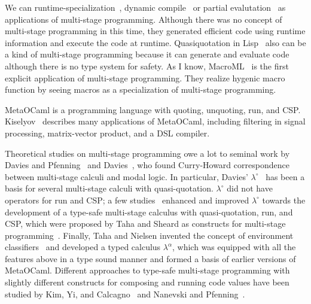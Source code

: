 We can runtime-specialization~\cite{ConselNoel1996Runtime},
dynamic compile~\cite{AuslanderPhiliposeChambersEggersBershad1996DynamicCompilation, EnglerHsiehKaashoek1996TickC, PolettoHsiehEnglerKaashoek1999CandTcc, GrantPhiliposeMockChambersEggers1999DyC} or
partial evalutation~\cite{JonesGomardSestoft1993partial} as applications of
multi-stage programming. Although there was no concept of multi-stage
programming in this time, they generated efficient code using runtime
information and execute the code at runtime. Quasiquotation in
Lisp~\cite{Bawden1999Lisp} also can be a kind of multi-stage programming
because it can generate and evaluate code although there is no type system for
safety. As I know, MacroML~\cite{GanzAmrTaha2001MacroML} is the first explicit
application of multi-stage programming. They realize hygenic macro function by
seeing macros as a specialization of multi-stage programming.



MetaOCaml is a programming language with quoting, unquoting, run, and CSP.
Kiselyov~\cite{8384206} describes many applications of MetaOCaml, including
filtering in signal processing, matrix-vector product, and a DSL compiler.


Theoretical studies on multi-stage programming owe a lot to seminal work by
Davies and Pfenning~\cite{DaviesPfenning01JACM} and
Davies~\cite{davies1996temporal}, who found Curry-Howard correspondence
between multi-stage calculi and modal logic. In particular, Davies'
$\lambda^\circ$~\cite{davies1996temporal} has been a basis for several
multi-stage calculi with quasi-quotation. $\lambda^\circ$ did not have
operators for run and CSP; a few
studies~\cite{benaissa1999logical,MoggiTahaBenaissaSheard99ESOP} enhanced and
improved $\lambda^\circ$ towards the development of a type-safe multi-stage
calculus with quasi-quotation, run, and CSP, which were proposed by Taha and
Sheard as constructs for multi-stage programming~\cite{MetaML}. 
Finally, Taha and Nielsen invented the concept of environment
classifiers~\cite{taha2003environment} and developed a typed calculus
$\lambda^\alpha$, which was equipped with all the features above in a type
sound manner and formed a basis of earlier versions of MetaOCaml. Different
approaches to type-safe multi-stage programming with slightly different
constructs for composing and running code values have been studied by Kim,
Yi, and Calcagno~\cite{DBLP:conf/popl/KimYC06} and Nanevski and
Pfenning~\cite{DBLP:journals/jfp/NanevskiP05}.

